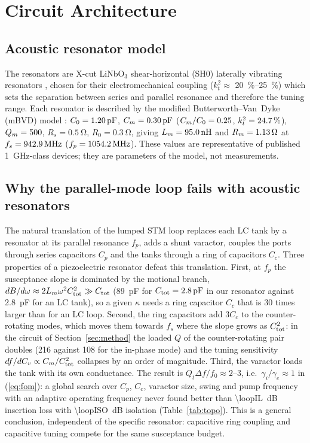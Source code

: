 \documentclass[journal]{IEEEtran}
\begin{document}
\section{Circuit Architecture}\label{sec:arch}
\subsection{Acoustic resonator model}
The resonators are X-cut LiNbO$_3$ shear-horizontal (SH0) laterally vibrating resonators \cite{gong2013design,lu2018lithium}, chosen for their electromechanical coupling ($k_t^2\approx$ \SIrange{20}{25}{\percent}) which sets the separation between series and parallel resonance and therefore the tuning range. Each resonator is described by the modified Butterworth--Van~Dyke (mBVD) model \cite{larson2000modified}: $C_0=\SI{1.20}{pF}$, $C_m=\SI{0.30}{pF}$ ($C_m/C_0=0.25$, $k_t^2=\SI{24.7}{\percent}$), $Q_m=500$, $R_s=\SI{0.5}{\ohm}$, $R_0=\SI{0.3}{\ohm}$, giving $L_m=\SI{95.0}{nH}$ and $R_m=\SI{1.13}{\ohm}$ at $f_s=\SI{942.9}{MHz}$ ($f_p=\SI{1054.2}{MHz}$). These values are representative of published \SI{1}{GHz}-class devices; they are parameters of the model, not measurements.

\subsection{Why the parallel-mode loop fails with acoustic resonators}
The natural translation of the lumped STM loop \cite{estep2014magnetic} replaces each LC tank by a resonator at its parallel resonance $f_p$, adds a shunt varactor, couples the ports through series capacitors $C_p$ and the tanks through a ring of capacitors $C_c$. Three properties of a piezoelectric resonator defeat this translation. First, at $f_p$ the susceptance slope is dominated by the motional branch, $dB/d\omega\approx 2L_m\omega^2C_{\rm tot}^2\gg C_{\rm tot}$ (\SI{89}{pF} for $C_{\rm tot}=\SI{2.8}{pF}$ in our resonator against \SI{2.8}{pF} for an LC tank), so a given $\kappa$ needs a ring capacitor $C_c$ that is \SI{30}{} times larger than for an LC loop. Second, the ring capacitors add $3C_c$ to the counter-rotating modes, which moves them towards $f_s$ where the slope grows as $C_{\rm tot}^2$: in the circuit of Section~\ref{sec:method} the loaded $Q$ of the counter-rotating pair doubles (\SI{216}{} against \SI{108}{} for the in-phase mode) and the tuning sensitivity $df/dC_v\propto C_m/C_{\rm tot}^2$ collapses by an order of magnitude. Third, the varactor loads the tank with its own conductance. The result is $Q_t\Delta f/f_0\approx 2$--$3$, i.e.\ $\gamma_i/\gamma_e\approx1$ in (\ref{eq:fom}): a global search over $C_p$, $C_c$, varactor size, swing and pump frequency with an adaptive operating frequency never found better than \SI{\loopIL}{dB} insertion loss with \SI{\loopISO}{dB} isolation (Table~\ref{tab:topo}). This is a general conclusion, independent of the specific resonator: capacitive ring coupling and capacitive tuning compete for the same susceptance budget.
\end{document}
